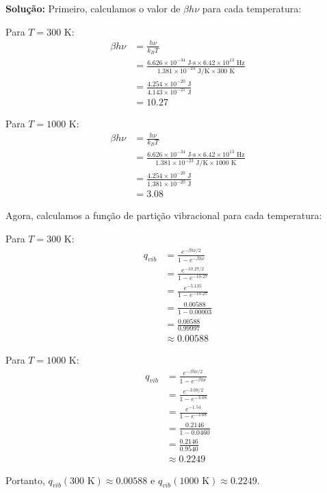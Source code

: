 \documentclass[fleqn,a4paper]{article}
\begin{document}
\textbf{Solução:}
Primeiro, calculamos o valor de $\beta h\nu$ para cada temperatura:

Para $T = 300$ K:
\begin{align}
\beta h\nu &= \frac{h\nu}{k_B T} \\
&= \frac{6.626 \times 10^{-34} \text{ J·s} \times 6.42 \times 10^{13} \text{ Hz}}{1.381 \times 10^{-23} \text{ J/K} \times 300 \text{ K}} \\
&= \frac{4.254 \times 10^{-20} \text{ J}}{4.143 \times 10^{-21} \text{ J}} \\
&= 10.27
\end{align}

Para $T = 1000$ K:
\begin{align}
\beta h\nu &= \frac{h\nu}{k_B T} \\
&= \frac{6.626 \times 10^{-34} \text{ J·s} \times 6.42 \times 10^{13} \text{ Hz}}{1.381 \times 10^{-23} \text{ J/K} \times 1000 \text{ K}} \\
&= \frac{4.254 \times 10^{-20} \text{ J}}{1.381 \times 10^{-20} \text{ J}} \\
&= 3.08
\end{align}

Agora, calculamos a função de partição vibracional para cada temperatura:

Para $T = 300$ K:
\begin{align}
q_{vib} &= \frac{e^{-\beta h\nu/2}}{1-e^{-\beta h\nu}} \\
&= \frac{e^{-10.27/2}}{1-e^{-10.27}} \\
&= \frac{e^{-5.135}}{1-e^{-10.27}} \\
&= \frac{0.00588}{1-0.00003} \\
&= \frac{0.00588}{0.99997} \\
&\approx 0.00588
\end{align}

Para $T = 1000$ K:
\begin{align}
q_{vib} &= \frac{e^{-\beta h\nu/2}}{1-e^{-\beta h\nu}} \\
&= \frac{e^{-3.08/2}}{1-e^{-3.08}} \\
&= \frac{e^{-1.54}}{1-e^{-3.08}} \\
&= \frac{0.2146}{1-0.0460} \\
&= \frac{0.2146}{0.9540} \\
&\approx 0.2249
\end{align}

Portanto, $q_{vib}(300 \text{ K}) \approx 0.00588$ e $q_{vib}(1000 \text{ K}) \approx 0.2249$.
\end{document}
